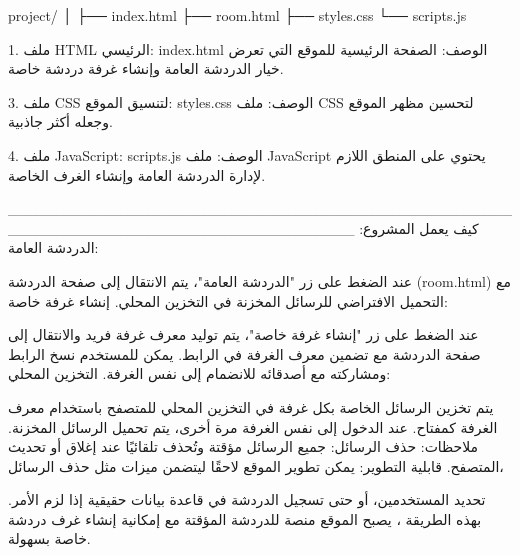 
project/
│
├── index.html
├── room.html
├── styles.css
└── scripts.js


1. ملف HTML الرئيسي: index.html
الوصف: الصفحة الرئيسية للموقع التي تعرض خيار الدردشة العامة وإنشاء غرفة دردشة خاصة.

3. ملف CSS لتنسيق الموقع: styles.css
الوصف: ملف CSS لتحسين مظهر الموقع وجعله أكثر جاذبية.

4. ملف JavaScript: scripts.js
الوصف: ملف JavaScript يحتوي على المنطق اللازم لإدارة الدردشة العامة وإنشاء الغرف الخاصة.


_________________________________________________________________________________
كيف يعمل المشروع:
الدردشة العامة:

عند الضغط على زر "الدردشة العامة"، يتم الانتقال إلى صفحة الدردشة 
(room.html) مع التحميل الافتراضي للرسائل المخزنة في التخزين المحلي.
إنشاء غرفة خاصة:

عند الضغط على زر "إنشاء غرفة خاصة"، يتم توليد معرف 
غرفة فريد والانتقال إلى صفحة الدردشة مع تضمين معرف الغرفة في الرابط.
 يمكن للمستخدم نسخ الرابط ومشاركته مع أصدقائه للانضمام إلى نفس الغرفة.
التخزين المحلي:

يتم تخزين الرسائل الخاصة بكل غرفة في التخزين المحلي للمتصفح باستخدام معرف الغرفة
 كمفتاح. عند الدخول إلى نفس الغرفة مرة أخرى، يتم تحميل الرسائل المخزنة.
ملاحظات:
حذف الرسائل: جميع الرسائل مؤقتة وتُحذف تلقائيًا عند إغلاق أو تحديث المتصفح.
قابلية التطوير: يمكن تطوير الموقع لاحقًا ليتضمن ميزات مثل حذف الرسائل،

تحديد المستخدمين، أو حتى تسجيل الدردشة في قاعدة بيانات حقيقية إذا لزم الأمر.
بهذه الطريقة
، يصبح الموقع منصة للدردشة المؤقتة مع إمكانية إنشاء غرف دردشة خاصة بسهولة.